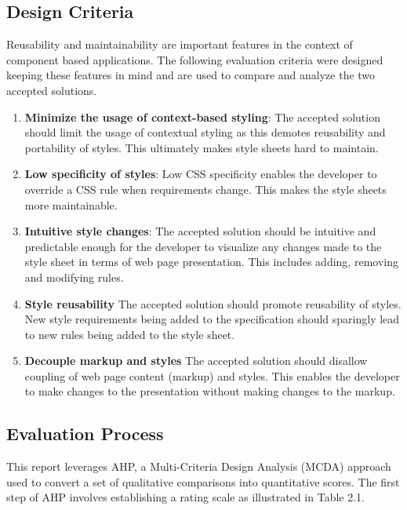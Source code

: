 \documentclass[12pt]{article}
\begin{document}
\subsection{Design Criteria}
Reusability and maintainability are important features in the context of component based applications. The following evaluation criteria were designed keeping these features in mind and are used to compare and analyze the two accepted solutions.
\begin{enumerate}

	\item \textbf{Minimize the usage of context-based styling}: The accepted solution should limit the usage of contextual styling as this demotes reusability and portability of styles. This ultimately makes style sheets hard to maintain.

	\item \textbf{Low specificity of styles}: Low CSS specificity enables the developer to override a CSS rule when requirements change. This makes the style sheets more maintainable.

	\item \textbf{Intuitive style changes}: The accepted solution should be intuitive and predictable enough for the developer to visualize any changes made to the style sheet in terms of web page presentation. This includes adding, removing and modifying rules.

	\item \textbf{Style reusability} The accepted solution should promote reusability of styles. New style requirements being added to the specification should sparingly lead to new rules being added to the style sheet.

	\item \textbf{Decouple markup and styles} The accepted solution should disallow coupling of web page content (markup) and styles. This enables the developer to make changes to the presentation without making changes to the markup.

\end{enumerate}

\subsection{Evaluation Process}
This report leverages AHP, a Multi-Criteria Design Analysis (MCDA) approach used to convert a set of qualitative comparisons into quantitative scores. The first step of AHP involves establishing a rating scale as illustrated in Table 2.1.
\end{document}
